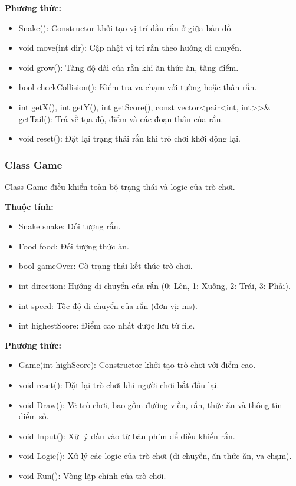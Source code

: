 \documentclass[a4paper,12pt]{article}
\begin{document}
\textbf{Phương thức:}
\begin{itemize}
    \item Snake(): Constructor khởi tạo vị trí đầu rắn ở giữa bản đồ.
    \item void move(int dir): Cập nhật vị trí rắn theo hướng di chuyển.
    \item void grow(): Tăng độ dài của rắn khi ăn thức ăn, tăng điểm.
    \item bool checkCollision(): Kiểm tra va chạm với tường hoặc thân rắn.
    \item int getX(), int getY(), int getScore(), const vector<pair<int, int>>& getTail(): Trả về tọa độ, điểm và các đoạn thân của rắn.
    \item void reset(): Đặt lại trạng thái rắn khi trò chơi khởi động lại.
\end{itemize}

\subsubsection{Class Game}
Class Game điều khiển toàn bộ trạng thái và logic của trò chơi.

\textbf{Thuộc tính:}
\begin{itemize}
    \item Snake snake: Đối tượng rắn.
    \item Food food: Đối tượng thức ăn.
    \item bool gameOver: Cờ trạng thái kết thúc trò chơi.
    \item int direction: Hướng di chuyển của rắn (0: Lên, 1: Xuống, 2: Trái, 3: Phải).
    \item int speed: Tốc độ di chuyển của rắn (đơn vị: ms).
    \item int highestScore: Điểm cao nhất được lưu từ file.
\end{itemize}

\textbf{Phương thức:}
\begin{itemize}
    \item Game(int highScore): Constructor khởi tạo trò chơi với điểm cao.
    \item void reset(): Đặt lại trò chơi khi người chơi bắt đầu lại.
    \item void Draw(): Vẽ trò chơi, bao gồm đường viền, rắn, thức ăn và thông tin điểm số.
    \item void Input(): Xử lý đầu vào từ bàn phím để điều khiển rắn.
    \item void Logic(): Xử lý các logic của trò chơi (di chuyển, ăn thức ăn, va chạm).
    \item void Run(): Vòng lặp chính của trò chơi.
\end{itemize}
\end{document}

